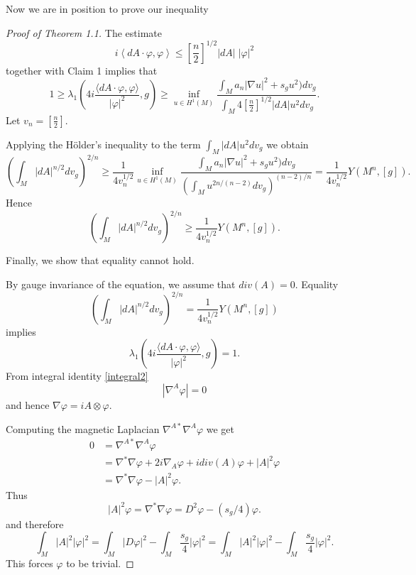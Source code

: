 \documentclass[11pt]{amsart}
\theoremstyle{plain}
\numberwithin{equation}{section}
\theoremstyle{plain}
\begin{document}
Now we are in position to prove our inequality
\begin{proof}[Proof of Theorem 1.1]
The estimate $$i\left\langle dA\cdot\varphi,\varphi\right\rangle\leq \left[\frac{n}{2}\right]^{1/2}|dA|\;|\varphi|^2$$
together with Claim 1 implies that
$$1\geq \lambda_1\left(4i\frac{\langle dA\cdot\varphi,\varphi\rangle}{|\varphi|^2},g\right)\geq \inf_{u\in H^1(M)} \dfrac{\int_M a_n|\nabla u|^2+s_gu^2)dv_g}{\int_M 4\left[\frac{n}{2}\right]^{1/2}|dA|u^2dv_g}.$$
Let $v_n=\left[\frac{n}{2}\right].$

 
Applying the Hölder's inequality to the term $\int_M |dA|u^2dv_g$ we obtain $$\left(\int_M |dA|^{n/2}dv_g\right)^{2/n}\geq \dfrac{1}{4v_n^{1/2}}\inf_{u\in H^1(M)} \dfrac{\int_M a_n|\nabla u|^2+s_gu^2)dv_g}{\left(\int_M u^{2n/(n-2)}dv_g\right)^{(n-2)/n}}=\dfrac{1}{4v_n^{1/2}}Y(M^n,[g]). $$ 
Hence $$\left(\int_M |dA|^{n/2}dv_g\right)^{2/n}\geq\dfrac{1}{4v_n^{1/2}}Y(M^n,[g]).$$


Finally, we show that equality cannot hold.


By gauge invariance of the equation, we assume that $div(A)=0$.
Equality $$\left(\int_M |dA|^{n/2}dv_g\right)^{2/n}=\dfrac{1}{4v_n^{1/2}}Y(M^n,[g])$$
implies $$\lambda_1\left(4i\frac{\langle dA\cdot\varphi,\varphi\rangle}{|\varphi|^2},g\right)=1.$$
From integral identity \eqref{integral2} $$|\nabla^A\varphi|=0$$
and hence $\nabla\varphi=iA\otimes\varphi$.

Computing the magnetic Laplacian $\nabla^{A*}\nabla^A\varphi$ we get \begin{align*}
0&=\nabla^{A*}\nabla^A\varphi\\
&=\nabla^*\nabla \varphi+2i\nabla_A\varphi+idiv(A)\varphi+|A|^2\varphi\\
&=\nabla^*\nabla\varphi-|A|^2\varphi.
\end{align*}
Thus
$$|A|^2\varphi=\nabla^*\nabla\varphi=D^2\varphi-(s_g/4)\varphi.$$
and therefore $$\int_M|A|^2|\varphi|^2=\int_M|D\varphi|^2-\int_M\frac{s_g}{4}|\varphi|^2=\int_M|A|^2|\varphi|^2-\int_M\frac{s_g}{4}|\varphi|^2.$$
This forces $\varphi$ to be trivial.
\end{proof}

 
 
\end{document}
